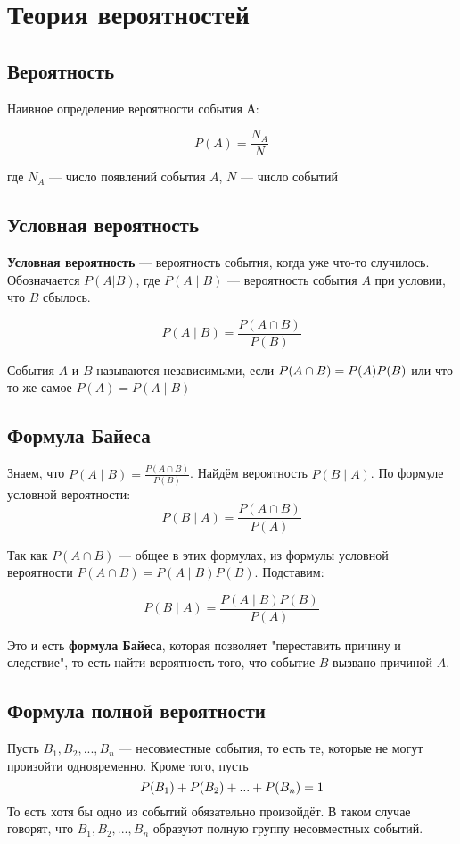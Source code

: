 \section{Теория вероятностей} 


\subsection{Вероятность}

Наивное определение вероятности события А:

$$
P(A) = \frac{N_A}{N}
$$

где $N_A$ --- число появлений события $A$, $N$ --- число событий

\subsection{Условная вероятность}

\textbf{Условная вероятность} --- вероятность события, когда уже что-то случилось.
Обозначается $P(A|B)$, где $P(A \mid B)$ --- вероятность события $A$ при условии, что $B$ сбылось.

$$
P(A \mid B)=\frac{P(A \cap B)}{P(B)}
$$

События $A$ и $B$ называются независимыми, если $P(A \cap B) \hm= P(A) P(B)$
 или что то же самое $P(A) = P(A \mid B)$
 
\subsection{Формула Байеса}

Знаем, что $P(A \mid B)=\frac{P(A \cap B)}{P(B)}$. Найдём вероятность $P(B \mid A)$. 
По формуле условной вероятности:
$$
P(B \mid A)=\frac{P(A \cap B)}{P(A)}
$$

Так как $P(A \cap B)$ --- общее в этих формулах, из формулы условной вероятности $P(A \cap B) = P (A \mid B) P(B)$. Подставим:

$$
P(B \mid A)=\frac{P (A \mid B) P(B)}{P(A)}
$$

Это и есть \textbf{формула Байеса}, которая позволяет "переставить причину и следствие", то есть найти вероятность того, что событие $B$ вызвано причиной $A$.

\subsection{Формула полной вероятности}

Пусть $B_1, B_2, ... , B_n$ --- несовместные события, то есть те, которые не могут произойти одновременно. Кроме того, пусть
$$P(B_1) + P(B_2) + ... + P(B_n) \hm= 1$$
То есть хотя бы одно из событий обязательно произойдёт. В таком случае говорят, что $B_1, B_2, ... , B_n$ образуют полную группу несовместных событий.

